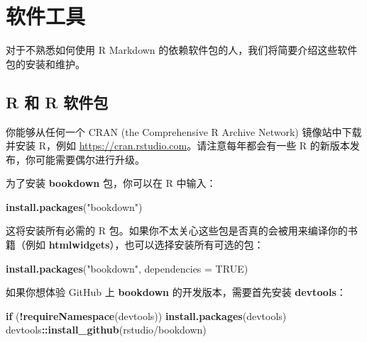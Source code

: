 \documentclass[
  12pt,
]{krantz}
\newenvironment{Shaded}{\begin{snugshade}}{\end{snugshade}}
\newcommand{\AttributeTok}[1]{\textcolor[rgb]{0.13,0.29,0.53}{#1}}
\newcommand{\ConstantTok}[1]{\textcolor[rgb]{0.56,0.35,0.01}{#1}}
\newcommand{\ControlFlowTok}[1]{\textcolor[rgb]{0.13,0.29,0.53}{\textbf{#1}}}
\newcommand{\FunctionTok}[1]{\textcolor[rgb]{0.13,0.29,0.53}{\textbf{#1}}}
\newcommand{\NormalTok}[1]{#1}
\newcommand{\SpecialCharTok}[1]{\textcolor[rgb]{0.81,0.36,0.00}{\textbf{#1}}}
\newcommand{\StringTok}[1]{\textcolor[rgb]{0.31,0.60,0.02}{#1}}
\theoremstyle{definition}
\theoremstyle{definition}
\theoremstyle{definition}
\theoremstyle{definition}
\theoremstyle{remark}
\begin{document}
\cleardoublepage

\appendix {}


\chapter{软件工具}\label{software-tools}

对于不熟悉如何使用 R Markdown 的依赖软件包的人，我们将简要介绍这些软件包的安装和维护。

\section{R 和 R 软件包}\label{r-ux548c-r-ux8f6fux4ef6ux5305}

你能够从任何一个 CRAN (the Comprehensive R Archive Network) 镜像站中下载并安装 R，例如 \url{https://cran.rstudio.com}。请注意每年都会有一些 R 的新版本发布，你可能需要偶尔进行升级。

为了安装 \textbf{bookdown} 包，你可以在 R 中输入：

\begin{Shaded}
\begin{Highlighting}[]
\FunctionTok{install.packages}\NormalTok{(}\StringTok{"bookdown"}\NormalTok{)}
\end{Highlighting}
\end{Shaded}

这将安装所有必需的 R 包。如果你不太关心这些包是否真的会被用来编译你的书籍（例如 \textbf{htmlwidgets}），也可以选择安装所有可选的包：

\begin{Shaded}
\begin{Highlighting}[]
\FunctionTok{install.packages}\NormalTok{(}\StringTok{"bookdown"}\NormalTok{, }\AttributeTok{dependencies =} \ConstantTok{TRUE}\NormalTok{)}
\end{Highlighting}
\end{Shaded}

如果你想体验 GitHub 上 \textbf{bookdown} 的开发版本，需要首先安装 \textbf{devtools}：

\begin{Shaded}
\begin{Highlighting}[]
\ControlFlowTok{if}\NormalTok{ (}\SpecialCharTok{!}\FunctionTok{requireNamespace}\NormalTok{(}\StringTok{\textquotesingle{}devtools\textquotesingle{}}\NormalTok{)) }\FunctionTok{install.packages}\NormalTok{(}\StringTok{\textquotesingle{}devtools\textquotesingle{}}\NormalTok{)}
\NormalTok{devtools}\SpecialCharTok{::}\FunctionTok{install\_github}\NormalTok{(}\StringTok{\textquotesingle{}rstudio/bookdown\textquotesingle{}}\NormalTok{)}
\end{Highlighting}
\end{Shaded}
\end{document}
